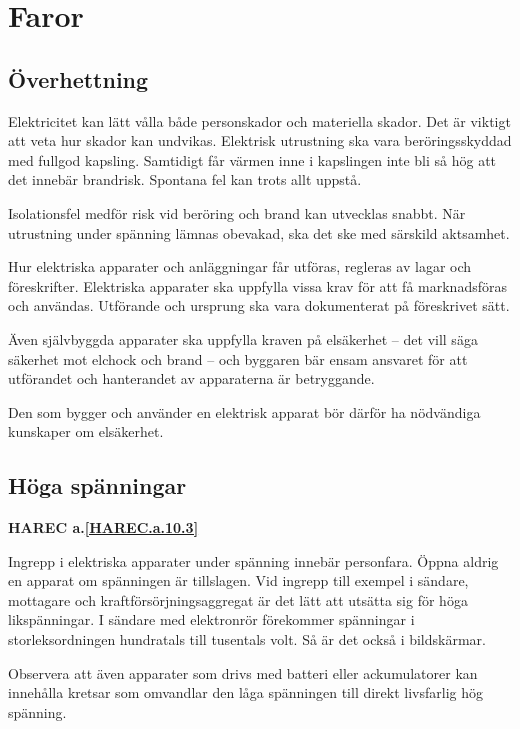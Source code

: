 \section{Faror}

\subsection{Överhettning}

Elektricitet kan lätt vålla både personskador och materiella skador.
Det är viktigt att veta hur skador kan undvikas.
Elektrisk utrustning ska vara beröringsskyddad med fullgod kapsling.
Samtidigt får värmen inne i kapslingen inte bli så hög att det innebär
brandrisk.
Spontana fel kan trots allt uppstå.

Isolationsfel medför risk vid beröring och brand kan utvecklas snabbt.
När utrustning under spänning lämnas obevakad, ska det ske med särskild
aktsamhet.

Hur elektriska apparater och anläggningar får utföras, regleras av
lagar och föreskrifter.
Elektriska apparater ska uppfylla vissa krav för att få marknadsföras och
användas.
Utförande och ursprung ska vara dokumenterat på föreskrivet sätt.

Även självbyggda apparater ska uppfylla kraven på elsäkerhet -- det vill säga
säkerhet mot elchock och brand -- och byggaren bär ensam ansvaret för att
utförandet och hanterandet av apparaterna är betryggande.

Den som bygger och använder en elektrisk apparat bör därför ha nödvändiga
kunskaper om elsäkerhet.

\subsection{Höga spänningar}
\textbf{
HAREC a.\ref{HAREC.a.10.3}\label{myHAREC.a.10.3}
}

Ingrepp i elektriska apparater under spänning innebär personfara.
Öppna aldrig en apparat om spänningen är tillslagen.
Vid ingrepp till exempel i sändare, mottagare och kraftförsörjningsaggregat är
det lätt att utsätta sig för höga likspänningar.
I sändare med elektronrör förekommer spänningar i storleksordningen hundratals
till tusentals volt.
Så är det också i bildskärmar.

Observera att även apparater som drivs med batteri eller ackumulatorer kan
innehålla kretsar som omvandlar den låga spänningen till direkt livsfarlig hög
spänning.

